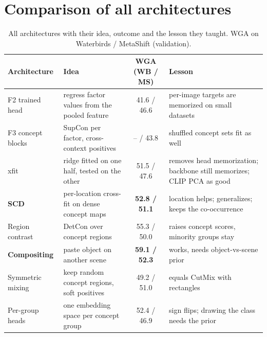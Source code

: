 \documentclass[11pt]{article}
\begin{document}
\section{Comparison of all architectures}
\label{sec:scoreboard}
\begin{table}[H]
\centering
\caption{All architectures with their idea, outcome and the lesson they taught. WGA on Waterbirds / MetaShift
(validation).}
\small
\begin{tabularx}{\linewidth}{>{\raggedright\arraybackslash}p{2.6cm} >{\raggedright\arraybackslash}X c >{\raggedright\arraybackslash}X}
\toprule
Architecture & Idea & WGA (WB / MS) & Lesson \\
\midrule
F2 trained head & regress factor values from the pooled feature & 41.6 / 46.6 & per-image targets are memorized on small datasets \\
F3 concept blocks & SupCon per factor, cross-context positives & -- / 43.8 & shuffled concept sets fit as well \\
xfit & ridge fitted on one half, tested on the other & 51.5 / 47.6 & removes head memorization; backbone still memorizes; CLIP PCA as good \\
\textbf{SCD} & per-location cross-fit on dense concept maps & \textbf{52.8 / 51.1} & location helps; generalizes; keeps the co-occurrence \\
Region contrast & DetCon over concept regions & 55.3 / 50.0 & raises concept scores, minority groups stay \\
\textbf{Compositing} & paste object on another scene & \textbf{59.1 / 52.3} & works, needs object-vs-scene prior \\
Symmetric mixing & keep random concept regions, soft positives & 49.2 / 51.0 & equals CutMix with rectangles \\
Per-group heads & one embedding space per concept group & 52.4 / 46.9 & sign flips; drawing the class needs the prior \\
\bottomrule
\end{tabularx}
\end{table}

\end{document}
